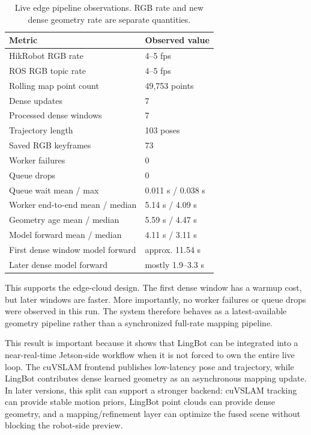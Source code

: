 \documentclass[11pt]{article}
\begin{document}
\begin{table}[H]
\centering
\caption{Live edge pipeline observations. RGB rate and new dense geometry rate are separate quantities.}
\label{tab:live}
\begin{tabular}{@{}ll@{}}
\toprule
\textbf{Metric} & \textbf{Observed value} \\
\midrule
HikRobot RGB rate & 4--5 fps \\
ROS RGB topic rate & 4--5 fps \\
Rolling map point count & 49,753 points \\
Dense updates & 7 \\
Processed dense windows & 7 \\
Trajectory length & 103 poses \\
Saved RGB keyframes & 73 \\
Worker failures & 0 \\
Queue drops & 0 \\
Queue wait mean / max & 0.011 s / 0.038 s \\
Worker end-to-end mean / median & 5.14 s / 4.09 s \\
Geometry age mean / median & 5.59 s / 4.47 s \\
Model forward mean / median & 4.11 s / 3.11 s \\
First dense window model forward & approx. 11.54 s \\
Later dense model forward & mostly 1.9--3.3 s \\
\bottomrule
\end{tabular}
\end{table}

This supports the edge-cloud design. The first dense window has a warmup cost, but later windows are faster. More importantly, no worker failures or queue drops were observed in this run. The system therefore behaves as a latest-available geometry pipeline rather than a synchronized full-rate mapping pipeline.

This result is important because it shows that LingBot can be integrated into a near-real-time Jetson-side workflow when it is not forced to own the entire live loop. The cuVSLAM frontend publishes low-latency pose and trajectory, while LingBot contributes dense learned geometry as an asynchronous mapping update. In later versions, this split can support a stronger backend: cuVSLAM tracking can provide stable motion priors, LingBot point clouds can provide dense geometry, and a mapping/refinement layer can optimize the fused scene without blocking the robot-side preview.
\end{document}
